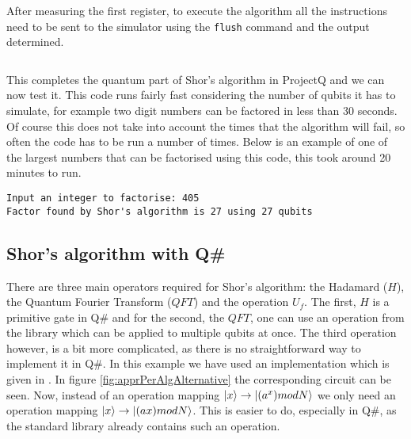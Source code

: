 After measuring the first register, to execute the algorithm all the instructions need to be sent to the simulator using the \texttt{flush} command and the output determined.

\inputminted[firstnumber=63, firstline=63, lastline=66]{python}{code/ProjectQ/shor_projectq_guide.txt}

This completes the quantum part of Shor's algorithm in ProjectQ and we can now test it. This code runs fairly fast considering the number of qubits it has to simulate, for example two digit numbers can be factored in less than 30 seconds. Of course this does not take into account the times that the algorithm will fail, so often the code has to be run a number of times. Below is an example of one of the largest numbers that can be factorised using this code, this took around 20 minutes to run.

\begin{verbatim}
Input an integer to factorise: 405
Factor found by Shor's algorithm is 27 using 27 qubits
\end{verbatim}

\subsection{Shor's algorithm with Q\#}

There are three main operators required for Shor's algorithm: the Hadamard ($H$), the Quantum Fourier Transform ($QFT$) and the operation $U_f$. The first, $H$ is a primitive gate in Q\# and for the second, the $QFT$, one can use an operation from the library which can be applied to multiple qubits at once. The third operation however, is a bit more complicated, as there is no straightforward way to implement it in Q\#. In this example we have used an implementation which is given in \cite{beauregard2003ShorImplementation}. In figure \ref{fig:apprPerAlgAlternative} the corresponding circuit can be seen. Now, instead of an operation mapping $\left\vert{x}\right\rangle \rightarrow \left\vert{(a^x)mod N}\right\rangle$ we only need an operation mapping $\left\vert{x}\right\rangle \rightarrow \left\vert{(ax)mod N}\right\rangle$. This is easier to do, especially in Q\#, as the standard library already contains such an operation.

